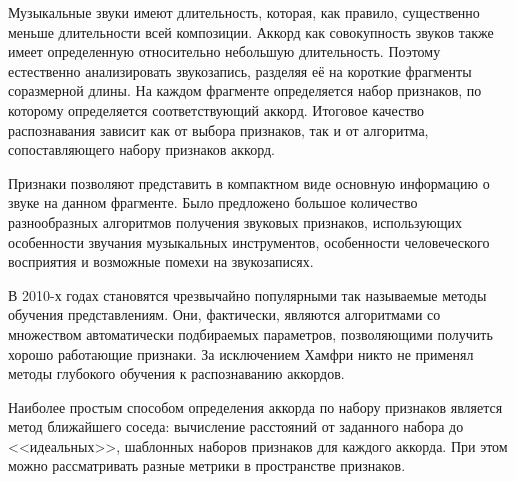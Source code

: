 
Музыкальные звуки имеют длительность, которая, как правило, существенно меньше
длительности всей композиции. Аккорд как совокупность звуков также имеет
определенную относительно небольшую длительность. Поэтому естественно
анализировать звукозапись, разделяя её на короткие фрагменты соразмерной длины.
На каждом фрагменте определяется набор признаков, по которому определяется
соответствующий аккорд. Итоговое качество распознавания зависит как от выбора
признаков, так и от алгоритма, сопоставляющего набору признаков аккорд.

Признаки позволяют представить в компактном виде основную информацию о звуке на
данном фрагменте. Было предложено большое количество разнообразных алгоритмов
получения звуковых признаков, использующих особенности звучания музыкальных
инструментов, особенности человеческого восприятия и возможные помехи на
звукозаписях.

В 2010-х годах становятся чрезвычайно популярными так называемые методы
обучения представлениям. Они, фактически, являются алгоритмами со множеством
автоматически подбираемых параметров, позволяющими получить хорошо работающие
признаки. За исключением Хамфри \cite{Humphrey2012} никто не применял методы
глубокого обучения к распознаванию аккордов.

Наиболее простым способом определения аккорда по набору признаков является метод
ближайшего соседа: вычисление расстояний от заданного набора до <<идеальных>>,
шаблонных наборов признаков для каждого аккорда. При этом можно рассматривать
разные метрики в пространстве признаков.

